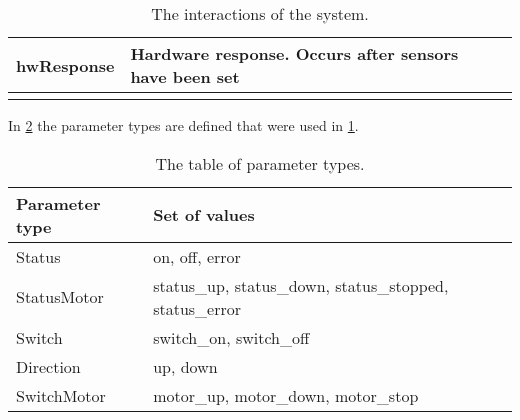 \begin{center}
\begin{longtable}{|l|p{8cm}|l|}
		hwResponse & Hardware response. Occurs after sensors have been set & \\ \hline
		
		\caption{The interactions of the system.}
		\label{tbl:interactions}
	\end{longtable}	
\end{center}

In \cref{tbl:parameterTypes} the parameter types are defined that were used in \cref{tbl:interactions}.



\begin{table}[htbp]	
	\centering
	\begin{tabular}{|l|l|}
		\hline
    	\textbf{Parameter type} & \textbf{Set of values} \\ \hline
    	Status				& on, off, error			\\
    	StatusMotor			& status\_up, status\_down, status\_stopped, status\_error	\\
    	Switch				& switch\_on, switch\_off					\\
    	Direction			& up, down					\\
    	SwitchMotor			& motor\_up, motor\_down, motor\_stop			\\ \hline
	\end{tabular}
	\caption{The table of parameter types.}
	\label{tbl:parameterTypes}
\end{table}

\begin{comment}
errorLightsOn & The	requested action can not be performed since the lights are on &
		\\
		errorLightsOff & The requested action can not be performed since the lights
		are off &
		\\
		errorBarriersOpen & The requested action can not be performed since the
		barriers are open & 
		\\
		errorBarriersClosed & The requested action can not be performed since the
		barriers are closed &
		\\
		errorDeckOpen & The requested action can not be performed since the deck is
		open & 
		\\
		errorDeckClosed & The requested action can not be performed since the desk is closed &
		\\
\end{comment}